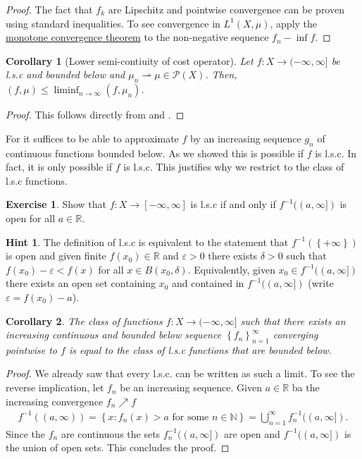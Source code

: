\documentclass[
    a4paper,
    DIV=14,
    abstract=true,
    numbers=noenddot
]
{scrartcl}
\newtheorem{corollary}[corollary]{Corollary}
\theoremstyle{definition}
\newtheorem{exercise}{Exercise}
\newtheorem*{hint}{Hint}
\newcommand{\eps}{\varepsilon}
\newcommand{\set}[1]{\left\{#1\right\}}
\newcommand{\N}{\mathbb{N}}
\newcommand{\R}{\mathbb{R}}
\newcommand{\Pp}{\mathcal{P}}
\begin{document}
\begin{proof}
    The fact that $f_k$ are Lipschitz and pointwise convergence can be proven using standard inequalities. To see convergence in $L^1(X,\mu )$, apply the \href{https://en.wikipedia.org/wiki/Monotone_convergence_theorem#Monotone_convergence_for_non-negative_measurable_functions_(Beppo_Levi)}{monotone convergence theorem} to the non-negative sequence $f_n -\inf f$.
\end{proof}
\begin{corollary}[Lower semi-contiuity of cost operator]\label{limit respects order}
    Let $f:X \to (-\infty, \infty]$ be l.s.c and bounded below and $\mu _n \rightharpoonup \mu \in \Pp (X)$. Then,  $(f,\mu )\leq\liminf_{n \to \infty} (f,\mu_n)$.
\end{corollary}
\begin{proof}
    This follows directly from  and .
\end{proof}

For  it suffices to be able to approximate $f$ by an increasing sequence $g_n$ of continuous functions  bounded below. As we showed this is possible if $f$ is l.s.c. In fact, it is only possible if $f$ is l.s.c. This justifies why we restrict to the class of l.s.c functions.

\begin{exercise}
    Show that $f: X \to [- \infty,\infty]$ is l.s.c if and only if $f^{-1}((a, \infty])$ is open for all $a \in \R$.
\end{exercise}
\begin{hint}
    The definition of l.s.c is equivalent to the statement that $f ^{-1}(\set{+\infty}) $ is open and given finite $f(x_0) \in \R$ and $\eps >0$ there exists $\delta  >0$ such that $f(x_0)-\eps  <f(x) $ for all $x \in B(x_0,\delta )$. Equivalently, given $x_0 \in f^{-1}((a, \infty])$ there exists an open set containing $x_0$ and contained in $f^{-1}((a, \infty])$ (write $\eps =f(x_0)-a$).
\end{hint}


\begin{corollary}\label{class condition}
    The class of functions $f:X \to (-\infty,\infty]$ such that there exists an increasing continuous and bounded below sequence $\set{f_n}_{n=1}^\infty$ converging pointwise to $f$ is equal to the class of l.s.c functions that are bounded below.
\end{corollary}
\begin{proof}
    We already saw that every l.s.c. can be written as such a limit. To see the reverse implication, let $f_n$ be an increasing sequence. Given $a \in \R$ ba the increasing convergence $f_n \nearrow f$
    \begin{align*}
        f ^{-1}((a,\infty))= \set{x: f_n(x)> a \text{ for some } n \in \N  }= \bigcup_{n=1}^ \infty f_n ^{-1}((a, \infty]).
    \end{align*}
    Since the $f_n$ are continuous the sets $f_n ^{-1}((a, \infty])$ are open and $ f ^{-1}((a,\infty])$ is the union of open sets. This concludes the proof.
\end{proof}
\end{document}
